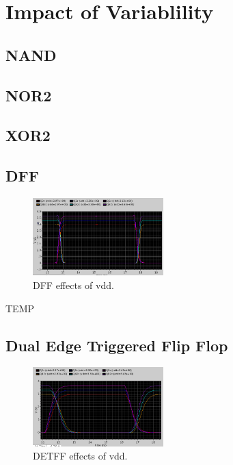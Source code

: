 \section{Impact of Variablility}


\subsection{NAND}

\subsection{NOR2}

\subsection{XOR2}

\subsection{DFF}

\begin{figure}[h]  
\centering
   \includegraphics[width=0.45\textwidth]{Figures/DFFvdd.png}
\caption{DFF effects of vdd.}
\label {fig:DFFvdd}
\end{figure}

TEMP


\subsection{Dual Edge Triggered Flip Flop}

\begin{figure}[h]  
\centering
   \includegraphics[width=0.45\textwidth]{Figures/DETFFvdd.png}
\caption{DETFF effects of vdd.}
\label {fig:DETFFvdd}
\end{figure}

